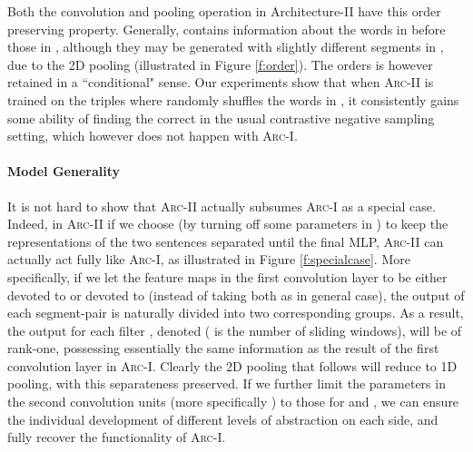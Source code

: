 \documentclass{article} \usepackage{nips14submit_e,times}
\newcommand{\0}{\ensuremath{\mathbf{0}}}
\newcommand{\1}{\ensuremath{\mathbf{1}}}
\begin{document}
Both the convolution and pooling operation in Architecture-II have this order preserving property. Generally,  contains information about the words in  before those in ,  although they may be generated with slightly different segments in , due to the 2D pooling (illustrated in Figure \ref{f:order}). The orders is however retained in a ``conditional" sense. Our experiments show that when \textsc{Arc-II} is trained on the  triples where  randomly shuffles the words in , it consistently gains some ability of finding the correct  in the usual contrastive negative sampling setting, which however does not happen with \textsc{Arc-I}. \vspace{-5pt}



\paragraph{Model Generality} It is not hard to show that \textsc{Arc-II} actually subsumes \textsc{Arc-I} as a special case. Indeed, in \textsc{Arc-II} if we choose (by turning off some parameters in ) to keep the representations of the two sentences separated until the final MLP, \textsc{Arc-II} can actually act fully like \textsc{Arc-I}, as illustrated in Figure \ref{f:specialcase}. More specifically, if we let the feature maps in the first convolution layer to be either devoted to  or devoted to  (instead of taking both as in general case), the output of each segment-pair is naturally divided into two corresponding groups. As a result, the output for each filter , denoted  ( is the number of sliding windows), will be of rank-one, possessing essentially the same information as the result of the first convolution layer in \textsc{Arc-I}. Clearly the 2D pooling that follows will reduce to 1D pooling, with this separateness preserved. If we further limit the parameters in the second convolution units (more specifically ) to those for  and , we can ensure the individual  development of different levels of abstraction on each side, and fully recover the functionality of \textsc{Arc-I}.
\end{document}
